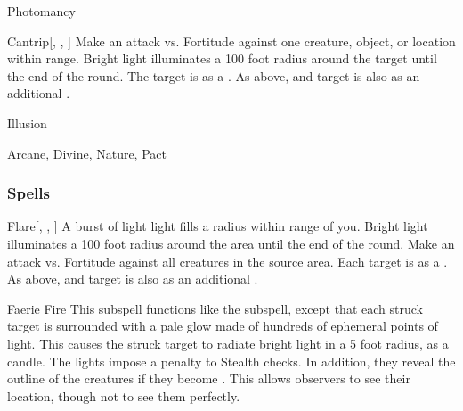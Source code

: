 \newpage
\begin{spellsection}{Photomancy}


\begin{ability}{Cantrip}[, , ]
Make an attack vs. Fortitude against one creature, object, or location within \rngmed range.
Bright light illuminates a 100 foot radius around the target until the end of the round.
\hit The target is \dazzled as a .
\crit As above, and target is also \dazed as an additional .
\end{ability}




 Illusion

 Arcane, Divine, Nature, Pact
\end{spellsection}


\subsubsection{Spells}


\begin{ability}[\nth{1}]{Flare}[, , ]
A burst of light light fills a \areasmall radius within \rngmed range of you.
Bright light illuminates a 100 foot radius around the area until the end of the round.
Make an attack vs. Fortitude against all creatures in the source area.
\hit Each target is \dazzled as a .
\crit As above, and target is also \dazed as an additional .
\end{ability}
\vspace{0.25em}



\begin{ability}[\nth{2}]{Faerie Fire}
This subspell functions like the  subspell, except that each struck target is surrounded with a pale glow made of hundreds of ephemeral points of light.
This causes the struck target to radiate bright light in a 5 foot radius, as a candle.
The lights impose a  penalty to Stealth checks.
In addition, they reveal the outline of the creatures if they become .
This allows observers to see their location, though not to see them perfectly.
\end{ability}
\vspace{0.25em}



